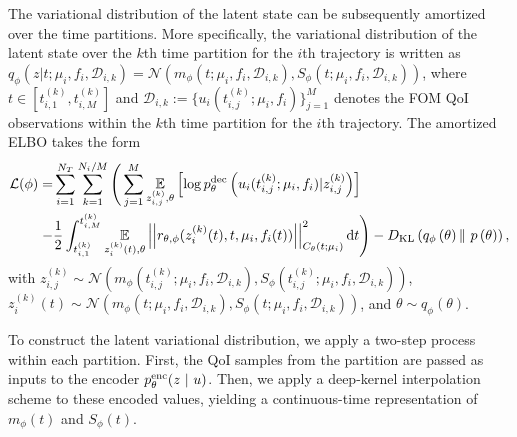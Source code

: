 \documentclass{article}
\begin{document}
	The variational distribution of the latent state can be subsequently amortized over the time partitions. More specifically, the variational distribution of the latent state over the $k$th time partition for the $i$th trajectory is written as $q_\phi(z | t; \mu_i, f_i, \mathcal{D}_{i,k}) = \mathcal{N}(m_\phi(t; \mu_i, f_i, \mathcal{D}_{i,k}), S_\phi(t; \mu_i, f_i, \mathcal{D}_{i,k}))$, where $t \in [t_{i,1}^{(k)}, t_{i,M}^{(k)}]$ and $\mathcal{D}_{i,k} := \{ u_i(t_{i,j}^{(k)}; \mu_i, f_i) \}_{j=1}^M$ denotes the FOM QoI observations within the $k$th time partition for the $i$th trajectory. The  amortized ELBO takes the form 
	\begin{equation} \label{eqn:amortized_elbo}
		\begin{aligned}
			\mathcal{L}(\phi) = & \sum_{i=1}^{N_T} 
			\sum_{k=1}^{N_i/M}
			\Bigg( \sum_{j=1}^{M} 
			\underset{ z_{i,j}^{(k)}, \theta }{\mathbb{E}}
			\left [ \log p_{\theta}^{\rm dec} \left ( u_{i}(t_{i,j}^{(k)};  \mu_i, f_i) | z_{i,j}^{(k)} \right )  \right ] \\
			- & \frac{1}{2} \int_{t_{i,1}^{(k)}}^{t_{i,M}^{(k)}}
			\underset{z_i^{(k)} (t), \theta}{\mathbb{E}}
			\left | \left | r_{\theta, \phi} (z_i^{(k)}(t), t, \mu_i, f_i(t)) \right | \right |_{C_{\theta}(t;\mu_i)}^2 \text{d}t \Bigg) - D_{\textrm{KL}}\left(q_\phi\left(\theta\right) \|\ p\left(\theta\right)\right),
		\end{aligned}
	\end{equation}
	with $z_{i,j}^{(k)} \sim \mathcal{N} ( m_\phi(t_{i,j}^{(k)}; \mu_i, f_i, \mathcal{D}_{i,k}), S_\phi (t_{i,j}^{(k)}; \mu_i, f_i, \mathcal{D}_{i,k}) )$, $z_i^{(k)}(t) \sim \mathcal{N} ( m_\phi(t; \mu_i, f_i, \mathcal{D}_{i,k}), S_\phi (t; \mu_i, f_i, \mathcal{D}_{i,k}) )$, and $\theta \sim q_\phi(\theta)$.
	
	To construct the latent variational distribution, we apply a two-step process within each partition. First, the QoI samples from the partition are passed as inputs to the encoder $p_\theta^{\rm enc}(z\ |\ u)$. Then, we apply a deep-kernel interpolation scheme to these encoded values, yielding a continuous-time representation of $m_\phi(t)$ and $S_\phi(t)$.
	
\end{document}
